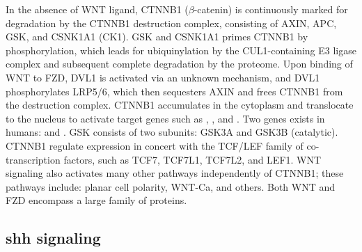 		In the absence of WNT ligand, CTNNB1 ($\beta$-catenin) is continuously marked for degradation by the CTNNB1 destruction complex, consisting of AXIN, APC, GSK, and CSNK1A1 (CK1). GSK and CSNK1A1 primes CTNNB1 by phosphorylation, which leads for ubiquinylation by the CUL1-containing E3 ligase complex and subsequent complete degradation by the proteome. Upon binding of WNT to FZD, DVL1 is activated via an unknown mechanism, and DVL1 phosphorylates LRP5/6, which then sequesters AXIN and frees CTNNB1 from the destruction complex. CTNNB1 accumulates in the cytoplasm and translocate to the nucleus to activate target genes such as , , and . Two  genes exists in humans:  and . GSK consists of two subunits: GSK3A and GSK3B (catalytic). CTNNB1 regulate expression in concert with the TCF/LEF family of co-transcription factors, such as TCF7, TCF7L1, TCF7L2, and LEF1. WNT signaling also activates many other pathways independently of CTNNB1; these pathways include: planar cell polarity, WNT-Ca, and others. Both WNT and FZD encompass a large family of proteins.


\subsection{\gls{shh} signaling}

